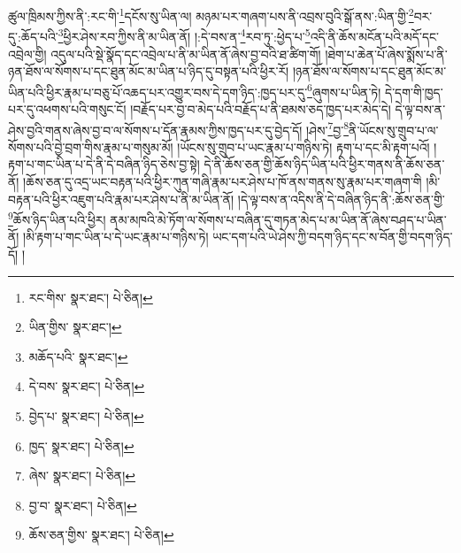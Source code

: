 ཚུལ་ཁྲིམས་ཀྱིས་ནི་:རང་གི་\footnote{རང་གིས་  སྣར་ཐང་།  པེ་ཅིན། }དངོས་སུ་ཡིན་ལ། མཉམ་པར་གཞག་པས་ནི་འབྲས་བུའི་སྒོ་ནས་:ཡིན་གྱི་\footnote{ཡིན་གྱིས་  སྣར་ཐང་། }བར་དུ་:ཆོད་པའི་\footnote{མཆོད་པའི་  སྣར་ཐང་། }ཕྱིར་ཤེས་རབ་ཀྱིས་ནི་མ་ཡིན་ནོ། །:དེ་བས་ན་\footnote{དེ་བས་  སྣར་ཐང་།  པེ་ཅིན། }རབ་ཏུ་:ཕྱེད་པ་\footnote{བྱེད་པ་  སྣར་ཐང་།  པེ་ཅིན། }འདི་ནི་ཆོས་མངོན་པའི་མདོ་དང་འབྲེལ་གྱི། འདུལ་པའི་སྡེ་སྣོད་དང་འབྲེལ་པ་ནི་མ་ཡིན་ནོ་ཞེས་བྱ་བའི་ཐ་ཚིག་གོ། །ཐེག་པ་ཆེན་པོ་ཞེས་སྨོས་པ་ནི་ཉན་ཐོས་ལ་སོགས་པ་དང་ཐུན་མོང་མ་ཡིན་པ་ཉིད་དུ་བསྟན་པའི་ཕྱིར་རོ། །ཉན་ཐོས་ལ་སོགས་པ་དང་ཐུན་མོང་མ་ཡིན་པའི་ཕྱིར་རྣམ་པ་བཅུ་པོ་འཆད་པར་འགྱུར་བས་དེ་དག་ཉིད་:ཁྱད་པར་དུ་\footnote{ཁྱད་  སྣར་ཐང་།  པེ་ཅིན། }ཞུགས་པ་ཡིན་ཏེ། དེ་དག་གི་ཁྱད་པར་དུ་འཕགས་པའི་གསུང་ངོ། །བརྗོད་པར་བྱ་བ་མེད་པའི་བརྗོད་པ་ནི་ཐམས་ཅད་ཁྱད་པར་མེད་དེ། དེ་ལྟ་བས་ན་ཤེས་བྱའི་གནས་ཞེས་བྱ་བ་ལ་སོགས་པ་དོན་རྣམས་ཀྱིས་ཁྱད་པར་དུ་བྱེད་དོ། །ཤེས་\footnote{ཞེས་  སྣར་ཐང་།  པེ་ཅིན། }བྱ་\footnote{བྱ་བ་  སྣར་ཐང་།  པེ་ཅིན། }ནི་ཡོངས་སུ་གྲུབ་པ་ལ་སོགས་པའི་བྱེ་བྲག་གིས་རྣམ་པ་གསུམ་མོ། །ཡོངས་སུ་གྲུབ་པ་ཡང་རྣམ་པ་གཉིས་ཏེ། རྟག་པ་དང་མི་རྟག་པའོ། །རྟག་པ་གང་ཡིན་པ་དེ་ནི་དེ་བཞིན་ཉིད་ཅེས་བྱ་སྟེ། དེ་ནི་ཆོས་ཅན་གྱི་ཆོས་ཉིད་ཡིན་པའི་ཕྱིར་གནས་ནི་ཆོས་ཅན་ནོ། །ཆོས་ཅན་དུ་འདྲ་ཡང་བརྟན་པའི་ཕྱིར་ཀུན་གཞི་རྣམ་པར་ཤེས་པ་ཁོ་ནས་གནས་སུ་རྣམ་པར་གཞག་གི །མི་བརྟན་པའི་ཕྱིར་འཇུག་པའི་རྣམ་པར་ཤེས་པ་ནི་མ་ཡིན་ནོ། །དེ་ལྟ་བས་ན་འདིས་ནི་དེ་བཞིན་ཉིད་ནི་:ཆོས་ཅན་གྱི་\footnote{ཆོས་ཅན་གྱིས་  སྣར་ཐང་།  པེ་ཅིན། }ཆོས་ཉིད་ཡིན་པའི་ཕྱིར། ནམ་མཁའི་མེ་ཏོག་ལ་སོགས་པ་བཞིན་དུ་གཏན་མེད་པ་མ་ཡིན་ནོ་ཞེས་བཤད་པ་ཡིན་ནོ། །མི་རྟག་པ་གང་ཡིན་པ་དེ་ཡང་རྣམ་པ་གཉིས་ཏེ། ཡང་དག་པའི་ཡེ་ཤེས་ཀྱི་བདག་ཉིད་དང་ས་བོན་གྱི་བདག་ཉིད་དོ། །
